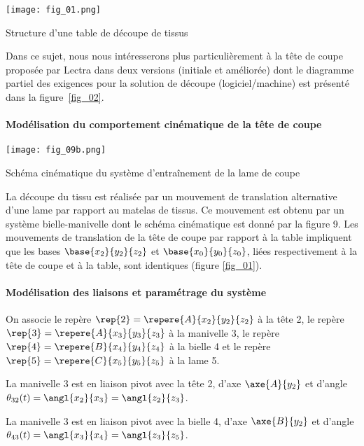 \begin{marginfigure}
\texttt{[image: fig\_01.png]}
\caption{Structure d’une table de découpe de tissus \label{fig_01}}
\end{marginfigure}
	
Dans ce sujet, nous nous intéresserons plus particulièrement à la tête de coupe proposée par Lectra dans deux versions (initiale et améliorée) dont le diagramme partiel des exigences pour la solution de découpe (logiciel/machine) est présenté dans la figure~\ref{fig_02}.



\paragraph*{Modélisation du comportement cinématique de la tête de coupe}


\begin{marginfigure}
\centering
\texttt{[image: fig\_09b.png]}
\caption{Schéma cinématique  du système d’entraînement de la lame de coupe\label{fig_09}}
\end{marginfigure}


La découpe du tissu est réalisée par un mouvement de translation alternative d’une lame par rapport au matelas de tissus. Ce mouvement est obtenu par un système bielle-manivelle dont le schéma cinématique est donné par la figure 9. Les mouvements de translation de la tête de coupe par rapport à la table impliquent que les bases $\base{x_2}{y_2}{z_2}$ et $\base{x_0}{y_0}{z_0}$, liées respectivement à la tête de coupe et à la table, sont identiques (figure \ref{fig_01}).





\paragraph*{Modélisation des liaisons et paramétrage du système}

On associe le repère  $\rep{2}=\repere{A}{x_2}{y_2}{z_2}$ à la tête 2, le repère $\rep{3}=\repere{A}{x_3}{y_3}{z_3}$ à la manivelle 3, le repère $\rep{4}=\repere{B}{x_4}{y_4}{z_4}$ à la bielle 4 et le repère $\rep{5}=\repere{C}{x_5}{y_5}{z_5}$ à la lame 5.

La manivelle 3 est en liaison pivot avec la tête 2, d’axe $\axe{A}{y_2}$ et d’angle $\theta_{32} (t)= \angl{x_2}{x_3} = \angl{z_2}{z_3} $.

La manivelle 3 est en liaison pivot avec la bielle 4, d’axe $\axe{B}{y_2}$ et d’angle $\theta_{43} (t)= \angl{x_3}{x_4} = \angl{z_3}{z_5} $.

